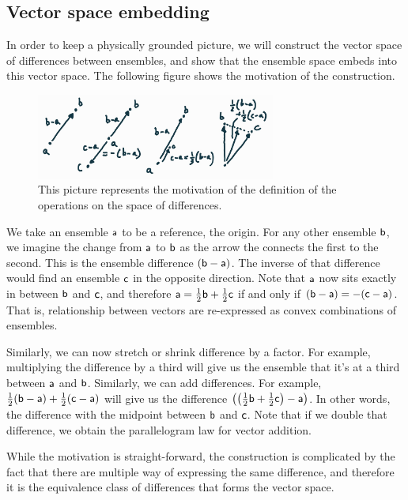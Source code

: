 \subsection{Vector space embedding}

In order to keep a physically grounded picture, we will construct the vector space of differences between ensembles, and show that the ensemble space embeds into this vector space. The following figure shows the motivation of the construction.

\begin{figure}[H]
	\centering
	\includegraphics[width=0.7\textwidth]{tempimages/EnsembleDifferences.jpg}
	\caption{This picture represents the motivation of the definition of the operations on the space of differences.}
\end{figure}

We take an ensemble $\ens[a]$ to be a reference, the origin. For any other ensemble $\ens[b]$, we imagine the change from $\ens[a]$ to $\ens[b]$ as the arrow the connects the first to the second. This is the ensemble difference $(\ens[b] - \ens[a])$. The inverse of that difference would find an ensemble $\ens[c]$ in the opposite direction. Note that $\ens[a]$ now sits exactly in between $\ens[b]$ and $\ens[c]$, and therefore $\ens[a] = \frac{1}{2}\ens[b] + \frac{1}{2}\ens[c]$ if and only if $(\ens[b] - \ens[a]) = - (\ens[c]- \ens[a])$. That is, relationship between vectors are re-expressed as convex combinations of ensembles.

Similarly, we can now stretch or shrink difference by a factor. For example, multiplying the difference by a third will give us the ensemble that it's at a third between $\ens[a]$ and $\ens[b]$. Similarly, we can add differences. For example, $\frac{1}{2}(\ens[b] - \ens[a]) + \frac{1}{2}(\ens[c] - \ens[a])$ will give us the difference $\left(\left(\frac{1}{2}\ens[b] + \frac{1}{2}\ens[c]\right) - \ens[a]\right)$. In other words, the difference with the midpoint between $\ens[b]$ and $\ens[c]$. Note that if we double that difference, we obtain the parallelogram law for vector addition.

While the motivation is straight-forward, the construction is complicated by the fact that there are multiple way of expressing the same difference, and therefore it is the equivalence class of differences that forms the vector space.

